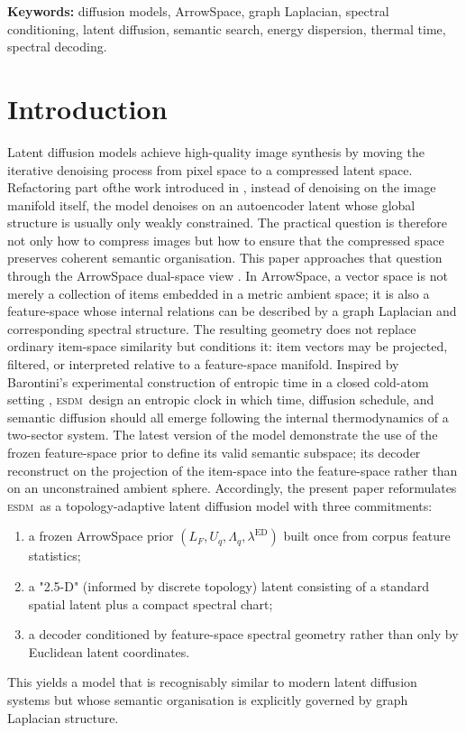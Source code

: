 \documentclass[11pt]{article}
\newcommand{\ESDM}{\textsc{esdm}}
\newcommand{\Lf}{L_F}
\newcommand{\Uq}{U_q}
\newcommand{\Lq}{\Lambda_q}
\newcommand{\ed}{\lambda^{\mathrm{ED}}}
\begin{document}
    \vspace{1em} \noindent \textbf{Keywords:} diffusion models, ArrowSpace, graph Laplacian, spectral conditioning, latent diffusion, semantic search, energy dispersion, thermal time, spectral decoding.  \newpage \tableofcontents \newpage  %
    \section{Introduction} \label{sec:introduction} %
    Latent diffusion models achieve high-quality image synthesis by moving the iterative denoising process from pixel space to a compressed latent space. Refactoring part ofthe work introduced in \cite{Moriondo2026VDT}, instead of denoising on the image manifold itself, the model denoises on an autoencoder latent whose global structure is usually only weakly constrained. The practical question is therefore not only how to compress images but how to ensure that the compressed space preserves coherent semantic organisation.  This paper approaches that question through the ArrowSpace dual-space view \cite{Moriondo2025JOSS, MoriondoAzizi2026}. In ArrowSpace, a vector space is not merely a collection of items embedded in a metric ambient space; it is also a feature-space whose internal relations can be described by a graph Laplacian and corresponding spectral structure. The resulting geometry does not replace ordinary item-space similarity but conditions it: item vectors may be projected, filtered, or interpreted relative to a feature-space manifold. Inspired by Barontini's experimental construction of entropic time in a closed cold-atom setting \cite{Barontini2026}, \ESDM~design an entropic clock in which time, diffusion schedule, and semantic diffusion should all emerge following the internal thermodynamics of a two-sector system. The latest version of the model demonstrate the use of the frozen feature-space prior to define its valid semantic subspace; its decoder reconstruct on the projection of the item-space into the feature-space rather than on an unconstrained ambient sphere.  Accordingly, the present paper reformulates \ESDM~as a topology-adaptive latent diffusion model with three commitments: 
    \begin{enumerate}[leftmargin=1.5em] 
      \item a frozen ArrowSpace prior $(\Lf,\Uq,\Lq,\ed)$ built once from corpus feature statistics;
      \item a "2.5-D" (informed by discrete topology) latent consisting of a standard spatial latent plus a compact spectral chart;
      \item a decoder conditioned by feature-space spectral geometry rather than only by Euclidean latent coordinates. 
    \end{enumerate}  
    This yields a model that is recognisably similar to modern latent diffusion systems but whose semantic organisation is explicitly governed by graph Laplacian structure.  
    
\end{document}
